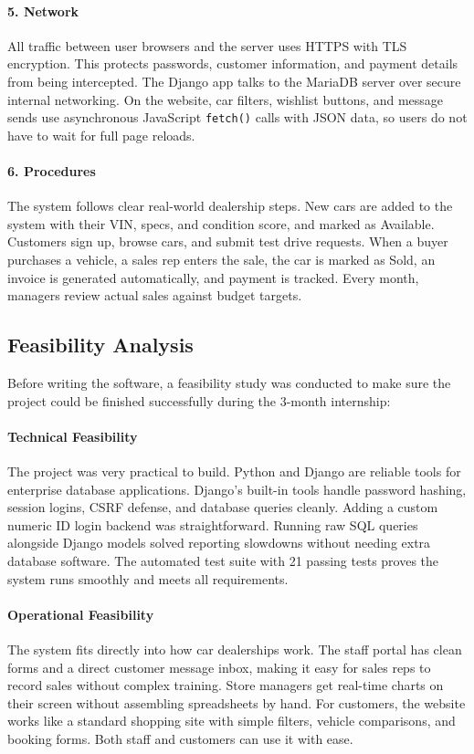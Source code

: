 \paragraph{5. Network}
All traffic between user browsers and the server uses HTTPS with TLS encryption. This protects passwords, customer information, and payment details from being intercepted. The Django app talks to the MariaDB server over secure internal networking. On the website, car filters, wishlist buttons, and message sends use asynchronous JavaScript \texttt{fetch()} calls with JSON data, so users do not have to wait for full page reloads.

\paragraph{6. Procedures}
The system follows clear real-world dealership steps. New cars are added to the system with their VIN, specs, and condition score, and marked as Available. Customers sign up, browse cars, and submit test drive requests. When a buyer purchases a vehicle, a sales rep enters the sale, the car is marked as Sold, an invoice is generated automatically, and payment is tracked. Every month, managers review actual sales against budget targets.

\subsection{Feasibility Analysis}
Before writing the software, a feasibility study was conducted to make sure the project could be finished successfully during the 3-month internship:

\paragraph{Technical Feasibility}
The project was very practical to build. Python and Django are reliable tools for enterprise database applications. Django's built-in tools handle password hashing, session logins, CSRF defense, and database queries cleanly. Adding a custom numeric ID login backend was straightforward. Running raw SQL queries alongside Django models solved reporting slowdowns without needing extra database software. The automated test suite with 21 passing tests proves the system runs smoothly and meets all requirements.

\paragraph{Operational Feasibility}
The system fits directly into how car dealerships work. The staff portal has clean forms and a direct customer message inbox, making it easy for sales reps to record sales without complex training. Store managers get real-time charts on their screen without assembling spreadsheets by hand. For customers, the website works like a standard shopping site with simple filters, vehicle comparisons, and booking forms. Both staff and customers can use it with ease.

